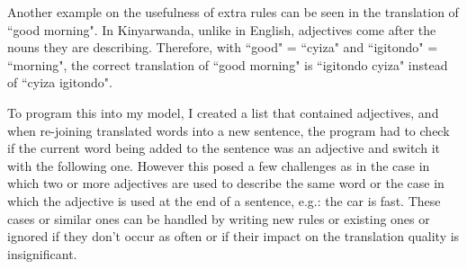 Another example on the usefulness of extra rules can be seen in the translation of ``good morning". In Kinyarwanda, unlike in English, adjectives come after the nouns they are describing. Therefore, with ``good" = ``cyiza" and ``igitondo" = ``morning", the correct translation of ``good morning" is ``igitondo cyiza" instead of ``cyiza igitondo".

To program this into my model, I created a list that contained adjectives, and when re-joining translated words into a new sentence, the program had to check if the current word being added to the sentence was an adjective and switch it with the following one. However this posed a few challenges as in the case in which two or more adjectives are used to describe the same word or the case in which the adjective is used at the end of a sentence, e.g.: the car is fast. These cases or similar ones can be handled by writing new rules or existing ones or ignored if they don't occur as often or if their impact on the translation quality is insignificant.
